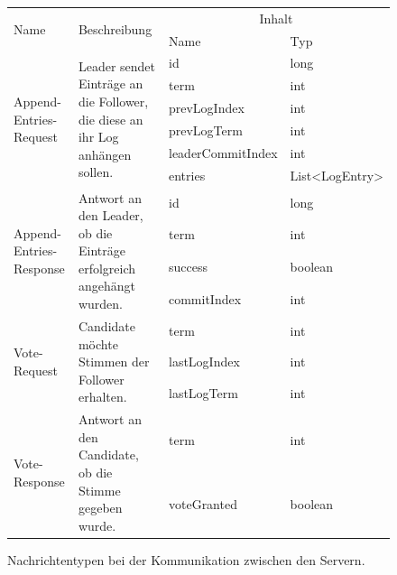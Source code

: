 \begin{figure}[h]
	\footnotesize
	\begin{tabular}{ | l | l | l | l |}	
		\hline
		\multirow{2}{*}{Name} & \multirow{2}{*}{Beschreibung} & \multicolumn{2}{|c|}{Inhalt}  \\ \cline{3-4}
		& & Name & Typ \\ \hline
		\multirow{6}{*}{Append-Entries-Request} & \multirow{6}{0.3\textwidth}{Leader sendet Einträge an die Follower, die diese an ihr Log anhängen sollen.} 
		& id & long \\
		& & term & int \\ 
		& &  prevLogIndex & int \\
		& &  prevLogTerm & int \\ 
		& & leaderCommitIndex &  int \\
		& & entries & List\textless{}LogEntry\textgreater \\ \hline
		\multirow{4}{*}{Append-Entries-Response} &  \multirow{4}{0.3\textwidth}{Antwort an den Leader, ob die Einträge erfolgreich angehängt wurden.} 
		& id & long\\
		& & term & int \\
		& & success & boolean \\
		& & commitIndex & int \\ \hline
		\multirow{3}{*}{Vote-Request} &  \multirow{3}{0.3\textwidth}{Candidate möchte Stimmen der Follower erhalten.} 
		& term & int \\
		& & lastLogIndex & int \\
		& & lastLogTerm & int \\ \hline
		\multirow{2}{*}{Vote-Response} &  \multirow{2}{0.3\textwidth}{Antwort an den Candidate, ob die Stimme gegeben wurde.} & term & int\\
		& & voteGranted & boolean \\ \hline
	\end{tabular}
	\caption{Nachrichtentypen bei der Kommunikation zwischen den Servern.}
	\label{fig:server-messages}
\end{figure}

